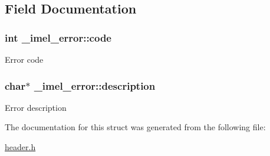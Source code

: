 \subsection{Field Documentation}
\subsubsection[{\texorpdfstring{code}{code}}]{\setlength{\rightskip}{0pt plus 5cm}int \+\_\+imel\+\_\+error\+::code}\hypertarget{struct__imel__error_a473e5bd44dd6abf7b40bff9e1b930bfa}{}\label{struct__imel__error_a473e5bd44dd6abf7b40bff9e1b930bfa}
Error code 
\subsubsection[{\texorpdfstring{description}{description}}]{\setlength{\rightskip}{0pt plus 5cm}char$\ast$ \+\_\+imel\+\_\+error\+::description}\hypertarget{struct__imel__error_aa5a783bee5d7d963d01e40f06dd3f772}{}\label{struct__imel__error_aa5a783bee5d7d963d01e40f06dd3f772}
Error description 

The documentation for this struct was generated from the following file\+:\begin{DoxyCompactItemize}
\item 
\hyperlink{header_8h}{header.\+h}\end{DoxyCompactItemize}
